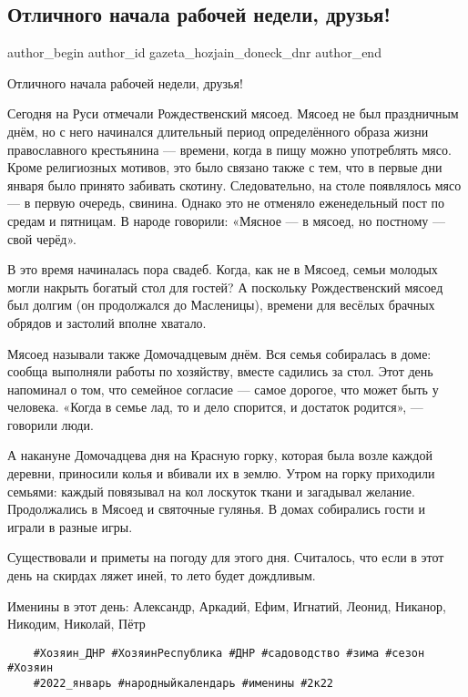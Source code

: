  
 
 
 
 
\subsection{Отличного начала рабочей недели, друзья!}
\label{sec:10_01_2022.vk.gazeta_hozjain_doneck_dnr.1.nedelja}

\ifcmt
 author_begin
   author_id gazeta_hozjain_doneck_dnr
 author_end
\fi

Отличного начала рабочей недели, друзья!

Сегодня на Руси отмечали Рождественский мясоед. Мясоед не был праздничным днём,
но с него начинался длительный период определённого образа жизни православного
крестьянина — времени, когда в пищу можно употреблять мясо. Кроме религиозных
мотивов, это было связано также с тем, что в первые дни января было принято
забивать скотину. Следовательно, на столе появлялось мясо — в первую очередь,
свинина. Однако это не отменяло еженедельный пост по средам и пятницам. В
народе говорили: «Мясное — в мясоед, но постному — свой черёд».


В это время начиналась пора свадеб. Когда, как не в Мясоед, семьи молодых могли
накрыть богатый стол для гостей? А поскольку Рождественский мясоед был долгим
(он продолжался до Масленицы), времени для весёлых брачных обрядов и застолий
вполне хватало.

Мясоед называли также Домочадцевым днём. Вся семья собиралась в доме: сообща
выполняли работы по хозяйству, вместе садились за стол. Этот день напоминал о
том, что семейное согласие — самое дорогое, что может быть у человека. «Когда в
семье лад, то и дело спорится, и достаток родится», — говорили люди.

А накануне Домочадцева дня на Красную горку, которая была возле каждой деревни,
приносили колья и вбивали их в землю. Утром на горку приходили семьями: каждый
повязывал на кол лоскуток ткани и загадывал желание. Продолжались в Мясоед и
святочные гулянья. В домах собирались гости и играли в разные игры.

Существовали и приметы на погоду для этого дня. Считалось, что если в этот день
на скирдах ляжет иней, то лето будет дождливым.

Именины в этот день: Александр, Аркадий, Ефим, Игнатий, Леонид, Никанор,
Никодим, Николай, Пётр

\begin{verbatim}
	#Хозяин_ДНР #ХозяинРеспублика #ДНР #садоводство #зима #сезон #Хозяин
	#2022_январь #народныйкалендарь #именины #2к22
\end{verbatim}

